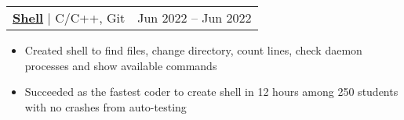 \documentclass[letterpaper,11pt]{article}
\makeatletter
\newcommand{\resumeItem}[1]{
  \item\small{
    {#1 \vspace{-2.5pt}}
  }
}
\newcommand{\resumeProjectHeading}[2]{
    \item
    \begin{tabular*}{0.97\textwidth}{l@{\extracolsep{\fill}}r}
      \small#1 & \footnotesize#2 \\
    \end{tabular*}\vspace{-7pt}
}
\newcommand{\resumeItemListStart}{\begin{itemize}}
\newcommand{\resumeItemListEnd}{\end{itemize}\vspace{-5pt}}
\makeatother
\begin{document}
           

        \resumeProjectHeading
          {\textbf{{\href{https://github.com/Usgupta/shell}{{\faLink} Shell}}} $|$ {C/C++, Git}}	{Jun 2022 -- Jun 2022}
          \resumeItemListStart
            \resumeItem{Created shell to find files, change directory, count lines, check daemon processes and show available commands}
            \resumeItem{Succeeded as the fastest coder to create shell in 12 hours among 250 students with no crashes from auto-testing}
          \resumeItemListEnd
          

          

      
          
\end{document}
